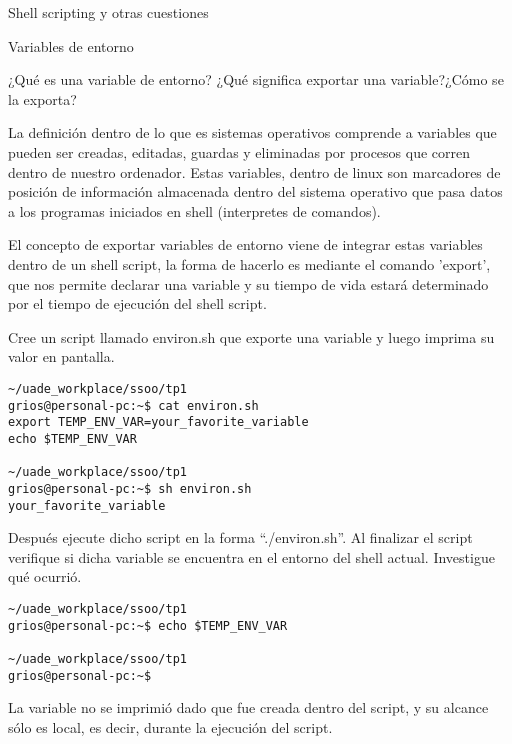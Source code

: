 \begin{section}{Shell scripting y otras cuestiones}

\begin{subsection}{Variables de entorno}

\begin{quoting}
¿Qué es una variable de entorno? ¿Qué significa exportar una variable?¿Cómo se la exporta?
\end{quoting}
La definición dentro de lo que es sistemas operativos comprende a variables que pueden ser creadas, editadas, guardas y eliminadas por procesos que corren dentro de nuestro ordenador. Estas variables, dentro de linux son marcadores de posición de información almacenada dentro del sistema operativo que pasa datos a los programas iniciados en shell (interpretes de comandos). 

El concepto de exportar variables de entorno viene de integrar estas variables dentro de un shell script, la forma de hacerlo es mediante el comando 'export', que nos permite declarar una variable y su tiempo de vida estará determinado por el tiempo de ejecución del shell script.\\

\begin{quoting}
Cree un script llamado environ.sh que exporte una variable y luego imprima su valor en pantalla.
\end{quoting}
\begin{lstlisting}[style=Ubuntu]
~/uade_workplace/ssoo/tp1
grios@personal-pc:~$ cat environ.sh 
export TEMP_ENV_VAR=your_favorite_variable
echo $TEMP_ENV_VAR

~/uade_workplace/ssoo/tp1
grios@personal-pc:~$ sh environ.sh 
your_favorite_variable
\end{lstlisting}

\begin{quoting}
Después ejecute dicho script en la forma “./environ.sh”. Al finalizar el script verifique si dicha
variable se encuentra en el entorno del shell actual. Investigue qué ocurrió.
\end{quoting}
\begin{lstlisting}[style=Ubuntu]
~/uade_workplace/ssoo/tp1
grios@personal-pc:~$ echo $TEMP_ENV_VAR

~/uade_workplace/ssoo/tp1
grios@personal-pc:~$
\end{lstlisting}
La variable no se imprimió dado que fue creada dentro del script, y su alcance sólo es local, es decir, durante la ejecución del script. \\


\end{subsection}
\end{section}
